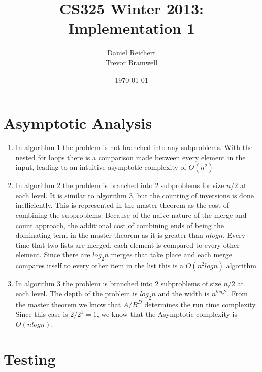 \documentclass[12pt]{article}
\title{CS325 Winter 2013: Implementation 1}
\author{
    Daniel Reichert \\
    Trevor Bramwell
}
\date{\today}
\begin{document}
\maketitle

\section*{Asymptotic Analysis}
    \begin{enumerate}

    \item In algorithm 1 the problem is not branched into any subproblems.
          With the nested for loops there is a comparison made between
          every element in the input, leading to an intuitive asymptotic
          complexity of $O(n^2)$

	\item In algorithm 2 the problem is branched into $2$ subproblems
          for size $n/2$ at each level.  It is similar to algorithm 3, but the
		  counting of inversions is done inefficiently.  This is represented in
		  the master theorem as the cost of combining the subproblems.  Because of the
		  naive nature of the merge and count approach, the additional cost of combining
		  ends of being the dominating term in the master theorem as it is greater than
		  $n log n$.  Every time that two lists are merged, each element is compared to
		  every other element.  Since there are $log_2 n$ merges that take place and
		  each merge compares itself to every other item in the list this is a $O(n^2 log n)$ algorithm.

    \item In algorithm 3 the problem is branched into $2$ subproblems of size
          $n/2$ at each level.  The depth of the problem is $log_2 n$
          and the width is $n^{log_2 2}$.  From the master theorem we know
          that $A/B^D$ determines the run time complexity.  Since this
          case is $2/2^1 = 1$, we know that the Asymptotic complexity is
          $O(n log n)$.

    \end{enumerate}

\section*{Testing}
\end{document}
